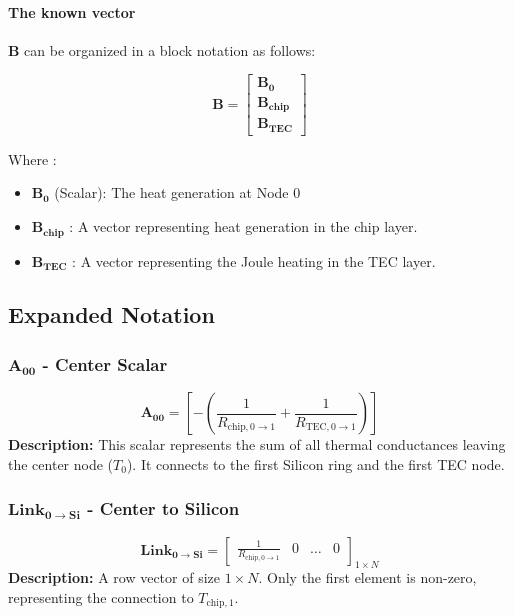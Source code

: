 \documentclass[10pt,a4paper,twocolumn]{article}
\begin{document}
\paragraph{The known vector} $\mathbf{B}$ can be organized in a block notation as follows:

\begin{equation}
  \mathbf{B}= 
  \begin{bmatrix} 
    \mathbf{B_0} \\  \mathbf{B_{\text{chip}}} \\ \mathbf{B_{\text{TEC}}} 
  \end{bmatrix}
\end{equation}

Where :

\begin{itemize}
\item $\mathbf{B_0}$ (Scalar): The heat generation at Node 0
\item $\mathbf{B_{\text{chip}}}$ : A vector representing heat generation in the chip layer.
\item $\mathbf{B_{\text{TEC}}}$ : A vector representing the Joule heating in the TEC layer.
\end{itemize}

\subsection{Expanded Notation}

\subsubsection{$\mathbf{A_{00}}$ - Center Scalar}
$$ \mathbf{A_{00}} = \left[ -\left(\frac{1}{R_{\text{chip}, 0\to 1}} + \frac{1}{R_{\text{TEC}, 0\to 1}}\right) \right] $$
\textbf{Description:} This scalar represents the sum of all thermal conductances leaving the center node ($T_0$). It connects to the first Silicon ring and the first TEC node.

\subsubsection{$\mathbf{Link_{0 \to Si}}$ - Center to Silicon}
$$ \mathbf{Link_{0 \to Si}} = \begin{bmatrix} \frac{1}{R_{\text{chip}, 0\to 1}} & 0 & \dots & 0 \end{bmatrix}_{1 \times N} $$
\textbf{Description:} A row vector of size $1 \times N$. Only the first element is non-zero, representing the connection to $T_{\text{chip},1}$.
\end{document}

